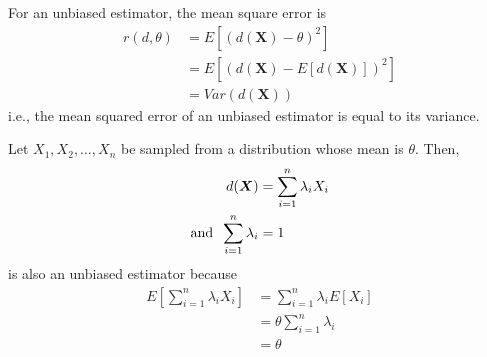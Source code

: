 \documentclass[../probability-notes.tex]{subfiles}
\begin{document}
    For an unbiased estimator, the mean square error is
    \begin{align*}
        r(d, \theta) &= E[(d(\boldsymbol{X}) - \theta)^{2}]\\
        &= E[(d(\boldsymbol{X}) - E[d(\boldsymbol{X})])^{2}]\\
        &= Var(d(\boldsymbol{X}))
    \end{align*}
    i.e., the mean squared error of an unbiased estimator is equal to its variance.\newline

    Let $X_{1}, X_{2}, \ldots, X_{n}$ be sampled from a distribution whose mean is $\theta$. Then,
    \begin{align*}
        d(\boldsymbol{X}) &= \sum_{i=1}^{n} \lambda_{i} X_{i}\\
        \text{and \:} \sum_{i=1}^{n}\lambda_{i} &= 1
    \end{align*}
    is also an unbiased estimator because
    \begin{align*}
        E[\sum_{i=1}^{n} \lambda_{i} X_{i}] &= \sum_{i=1}^{n} \lambda_{i} E[X_{i}]\\
        &= \theta \sum_{i=1}^{n}\lambda_{i}\\
        &= \theta
    \end{align*}


\end{document}
